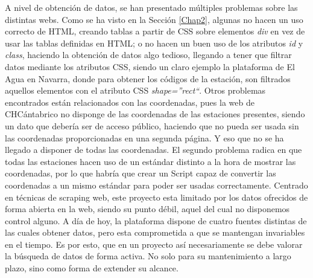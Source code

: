 \newline
A nivel de obtención de datos, se han presentado múltiples problemas sobre las distintas webs. Como se ha visto en la Sección \ref{Chap2}, algunas no hacen un uso correcto de HTML, creando tablas a partir de CSS sobre elementos \textit{div} en vez de usar las tablas definidas en HTML; o no hacen un buen uso de los atributos \textit{id} y \textit{class}, haciendo la obtención de datos algo tedioso, llegando a tener que filtrar datos mediante los atributos CSS, siendo un claro ejemplo la plataforma de El Agua en Navarra, donde para obtener los códigos de la estación, son filtrados aquellos elementos con el atributo CSS \textit{shape=''rect``}.\newline
\newline
Otros problemas encontrados están relacionados con las coordenadas, pues la web de CHCántabrico no disponge de las coordenadas de las estaciones presentes, siendo un dato que debería ser de acceso público, haciendo que no pueda ser usada sin las coordenadas proporcionadas en una segunda página. Y eso que no se ha llegado a disponer de todas las coordenadas. El segundo problema radica en que todas las estaciones hacen uso de un estándar distinto a la hora de mostrar las coordenadas, por lo que habría que crear un Script capaz de convertir las coordenadas a un mismo estándar para poder ser usadas correctamente.\newline
\newline
Centrado en técnicas de scraping web, este proyecto esta limitado por los datos ofrecidos de forma abierta en la web, siendo su punto débil, aquel del cual no disponemos control alguno. A día de hoy, la plataforma dispone de cuatro fuentes distintas de las cuales obtener datos, pero esta comprometida a que se mantengan invariables en el tiempo. Es por esto, que en un proyecto así necesariamente se debe valorar la búsqueda de datos de forma activa. No solo para su mantenimiento a largo plazo, sino como forma de extender su alcance.